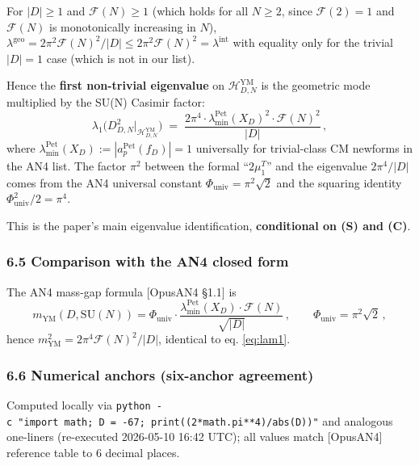 \documentclass[
  11pt,
  a4paper,
]{amsart}
\begin{document}
For \(|D| \ge 1\) and \(\mathcal{F}(N) \ge 1\) (which holds for all \(N \ge 2\), since
\(\mathcal{F}(2) = 1\) and \(\mathcal{F}(N)\) is monotonically increasing in \(N\)),
\(\lambda^{\mathrm{geo}} = 2\pi^2 \mathcal{F}(N)^2 / |D| \le 2\pi^2 \mathcal{F}(N)^2 = \lambda^{\mathrm{int}}\)
with equality only for the trivial \(|D| = 1\) case (which is not in our list).

Hence the \textbf{first non-trivial eigenvalue} on \(\mathcal{H}_{D,N}^{\mathrm{YM}}\)
is the geometric mode multiplied by the SU(N) Casimir factor:
\begin{equation}\label{eq:lam1}
\boxed{\;\lambda_1\bigl(D_{D,N}^2\big|_{\mathcal{H}_{D,N}^{\mathrm{YM}}}\bigr) \;=\; \frac{2\pi^4 \cdot \lambda_{\min}^{\mathrm{Pet}}(X_D)^2 \cdot \mathcal{F}(N)^2}{|D|}\,,\;}
\end{equation}
where \(\lambda_{\min}^{\mathrm{Pet}}(X_D) := |a_p^{\mathrm{Pet}}(f_D)| = 1\)
universally for trivial-class CM newforms in the AN4 list. The factor \(\pi^2\)
between the formal ``\(2\mu_1^T\)'' and the eigenvalue \(2\pi^4/|D|\) comes from the
AN4 universal constant \(\Phi_{\mathrm{univ}} = \pi^2 \sqrt{2}\) and the squaring
identity \(\Phi_{\mathrm{univ}}^2 / 2 = \pi^4\).

This is the paper's main eigenvalue identification, \textbf{conditional on (S) and (C)}.

\hypertarget{comparison-with-the-an4-closed-form}{%
\subsubsection{6.5 Comparison with the AN4 closed form}\label{comparison-with-the-an4-closed-form}}

The AN4 mass-gap formula {[}OpusAN4 §1.1{]} is
\[
m_{\mathrm{YM}}(D, \mathrm{SU}(N)) = \Phi_{\mathrm{univ}} \cdot \frac{\lambda_{\min}^{\mathrm{Pet}}(X_D) \cdot \mathcal{F}(N)}{\sqrt{|D|}}\,, \qquad \Phi_{\mathrm{univ}} = \pi^2\sqrt{2}\,,
\]
hence \(m_{\mathrm{YM}}^2 = 2\pi^4 \mathcal{F}(N)^2 / |D|\), identical to
eq. \eqref{eq:lam1}.

\hypertarget{numerical-anchors-six-anchor-agreement}{%
\subsubsection{6.6 Numerical anchors (six-anchor agreement)}\label{numerical-anchors-six-anchor-agreement}}

Computed locally via \texttt{python\ -c\ "import\ math;\ D\ =\ -67;\ print((2*math.pi**4)/abs(D))"}
and analogous one-liners (re-executed 2026-05-10 16:42 UTC); all values match
{[}OpusAN4{]} reference table to 6 decimal places.
\end{document}
